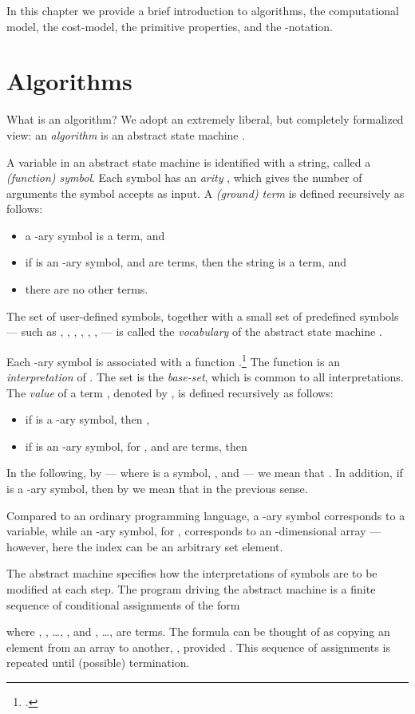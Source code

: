 \documentclass[b5paper, english, oneside]{memoir}
\begin{document}
In this chapter we provide a brief introduction to algorithms, the computational model, the cost-model, the primitive properties, and the -notation.

\section{Algorithms}
\label{Algorithms}

What is an algorithm? We adopt an extremely liberal, but completely formalized view: an \emph{algorithm} is an abstract state machine \cite{SequentialAsm, ParallelAsm, ASMBook}. 

A variable in an abstract state machine  is identified with a string, called a \emph{(function) symbol}. Each symbol has an \emph{arity} , which gives the number of arguments the symbol accepts as input. A \emph{(ground) term} is defined recursively as follows:
\begin{itemize}
\item a -ary symbol is a term, and
\item if  is an -ary symbol, and  are terms, then the string  is a term, and
\item there are no other terms.
\end{itemize}
The set of user-defined symbols, together with a small set of predefined symbols --- such as , , , , , ,  --- is called the \emph{vocabulary} of the abstract state machine .

Each -ary symbol  is associated with a function .\footnote{.} The function  is an \emph{interpretation} of . The set  is the \emph{base-set}, which is common to all interpretations. The \emph{value} of a term , denoted by , is defined recursively as follows:
\begin{itemize}
\item if  is a -ary symbol, then ,
\item if  is an -ary symbol, for , and  are terms, then

\end{itemize}
In the following, by  --- where  is a symbol, , and  --- we mean that . In addition, if  is a -ary symbol, then by  we mean that  in the previous sense.

Compared to an ordinary programming language, a -ary symbol corresponds to a variable, while an -ary symbol, for , corresponds to an -dimensional array --- however, here the index can be an arbitrary set element. 

The abstract machine specifies how the interpretations of symbols are to be modified at each step. The program driving the abstract machine is a finite sequence of conditional assignments of the form 
\begin{algorithmic}
\If{}
\State 
\State 
\State 
\EndIf
\end{algorithmic}
where , , \dots, , and , \dots,  are terms. The formula  can be thought of as copying an element from an array to another, , provided . This sequence of assignments is repeated until (possible) termination. 
\end{document}
